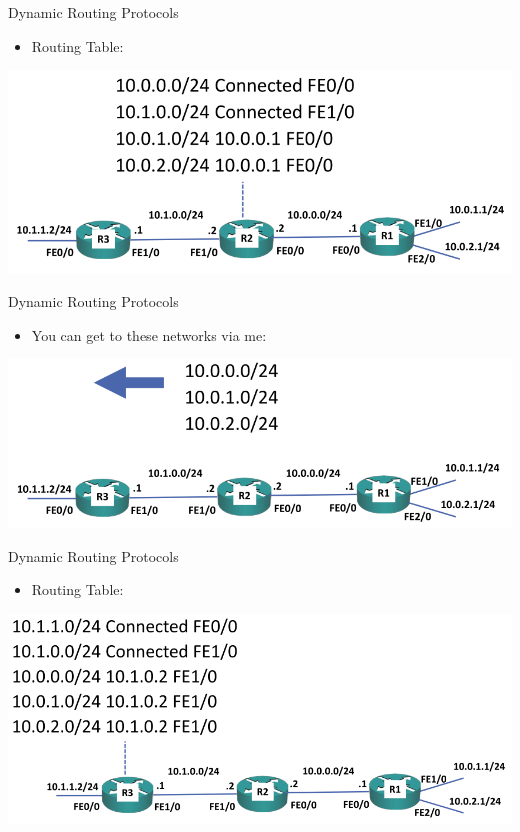 \documentclass[pdflatex,compress,mathserif]{beamer}
\begin{document}
\begin{frame}{Dynamic Routing Protocols}
	\begin{itemize}
		\item Routing Table:
	\end{itemize}
	\begin{center}
		\includegraphics[width=\linewidth]{img/img02}
	\end{center}
\end{frame}

\begin{frame}{Dynamic Routing Protocols}
	\begin{itemize}
		\item You can get to these networks via me:
	\end{itemize}
	\begin{center}
		\includegraphics[width=\linewidth]{img/img03}
	\end{center}
\end{frame}

\begin{frame}{Dynamic Routing Protocols}
	\begin{itemize}
		\item Routing Table:
	\end{itemize}
	\begin{center}
		\includegraphics[width=\linewidth]{img/img04}
	\end{center}
\end{frame}
\end{document}
